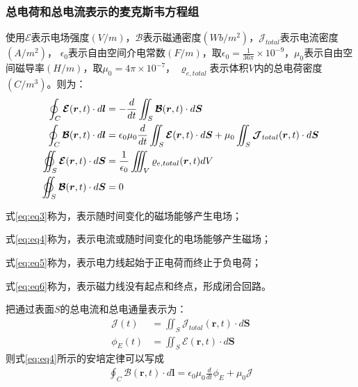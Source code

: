 \documentclass{article}
\numberwithin{equation}{section}
\renewcommand{\vec}[1]{\boldsymbol{#1}}
\begin{document}
\subsubsection{总电荷和总电流表示的麦克斯韦方程组}
使用$\vec{\mathcal{E}}$表示电场强度$(V/m)$，$\vec{\mathcal{B}}$表示磁通密度$(Wb/m^2)$，$\vec{\mathcal{J}}_{total}$表示电流密度$(A/m^2)$，
$\epsilon_0$表示自由空间介电常数$(F/m)$，取$\epsilon_0=\frac{1}{36\pi}\times 10^{-9}$，$\mu_0$表示自由空间磁导率$(H/m)$，取$\mu_0=4\pi \times 10^{-7}$，
$\varrho _{e,total}$表示体积$V$内的总电荷密度$(C/m^3)$。则\textbf{\color{blue}{麦克斯韦方程组的积分形式}}为：
\begin{align}
    \label{eq:eq3}
    \oint_C \vec{\mathcal{E}} (\vec{r},t)\cdot d\vec{l}&=-\frac{d}{dt}\iint_S \vec{\mathcal{B}} (\vec{r},t)\cdot d\vec{S} \\
    \label{eq:eq4}
    \oint_C \vec{\mathcal{B}} (\vec{r},t)\cdot d\vec{l}&=\epsilon _0 \mu_0 \frac{d}{dt}\iint_S \vec{\mathcal{E}} (\vec{r},t)\cdot d\vec{S}+\mu_0 \iint _S \vec{\mathcal{J}}_{total}(\vec{r},t)\cdot d\vec{S} \\
    \label{eq:eq5}
    \varoiint_S \vec{\mathcal{E}} (\vec{r},t)\cdot d\vec{S}&=\frac{1}{\epsilon_0}\iiint_V \varrho _{e,total}(\vec{r},t)dV \\
    \label{eq:eq6}
    \varoiint_S \vec{\mathcal{B}} (\vec{r},t)\cdot d\vec{S}&=0
\end{align}
\par
式\ref{eq:eq3}称为\textbf{\color{blue}{法拉第感应定律}}，表示随时间变化的磁场能够产生电场；\par
式\ref{eq:eq4}称为\textbf{\color{blue}{安培定律}}，表示电流或随时间变化的电场能够产生磁场；\par
式\ref{eq:eq5}称为\textbf{\color{blue}{高斯定律}}，表示电力线起始于正电荷而终止于负电荷；\par
式\ref{eq:eq6}称为\textbf{\color{blue}{磁场高斯定律}}，表示磁力线没有起点和终点，形成闭合回路。\par
把通过表面$S$的总电流和总电通量表示为：
\begin{align}
    \mathcal{J}(t)&=\iint_S \vec{\mathcal{J}}_{total}(\vec{r},t)\cdot d\vec{S} \\
    \phi_E(t)&=\iint_S \vec{\mathcal{E}}(\vec{r},t)\cdot d\vec{S}
\end{align}
则式\ref{eq:eq4}所示的安培定律可以写成
\begin{align}
    \oint_C \vec{\mathcal{B}} (\vec{r},t)\cdot d\vec{l}=\epsilon _0 \mu_0 \frac{d}{dt}\phi_E+\mu_0 \mathcal{J}
\end{align}
\end{document}
